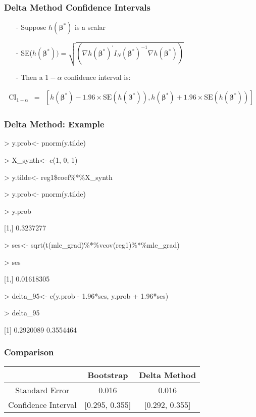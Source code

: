 \documentclass{beamer}
\begin{document}
\begin{frame}
\frametitle{Delta Method Confidence Intervals}

\begin{itemize}
\item[-] Suppose $h(\boldsymbol{\beta}^{*}) $ is a scalar\\
\item[-] SE($h(\boldsymbol{\beta}^{*} )) = \sqrt{\left(\nabla h(\boldsymbol{\beta}^{*})^{'}I_{N}(\boldsymbol{\beta}^{*})^{-1} \nabla h(\boldsymbol{\beta}^{*})\right) }$
\item[-] Then a $1- \alpha$ confidence interval is:
\end{itemize}

\begin{eqnarray}
\text{CI}_{1-\alpha} & = & \left[h(\boldsymbol{\beta}^{*} )- 1.96 \times \text{SE}(h(\boldsymbol{\beta}^{*} )) , h(\boldsymbol{\beta}^{*} ) + 1.96 \times \text{SE}(h(\boldsymbol{\beta}^{*} ) ) \right] \nonumber 
\end{eqnarray}


\end{frame}


\begin{frame}
\frametitle{Delta Method: Example}


\begin{semiverbatim}

> y.prob<- pnorm(y.tilde)

> X\_synth<- c(1, 0, 1)

> y.tilde<- reg1\$coef\%*\%X\_synth

> y.prob<- pnorm(y.tilde)

> y.prob
          
[1,] 0.3237277


> ses<- sqrt(t(mle\_grad)\%*\%vcov(reg1)\%*\%mle\_grad)

> ses
         
[1,] 0.01618305

> delta\_95<- c(y.prob - 1.96*ses, y.prob + 1.96*ses)

> delta\_95

[1] 0.2920089 0.3554464

\end{semiverbatim}


\end{frame}


\begin{frame}
\frametitle{Comparison}

\begin{tabular}{ccc}
\hline
	& Bootstrap & Delta Method \\
\hline	
Standard Error &  0.016		& 	0.016	\\
Confidence Interval & [0.295, 0.355]	 & [0.292, 0.355] \\
\hline
\end{tabular}



\end{frame}
\end{document}
